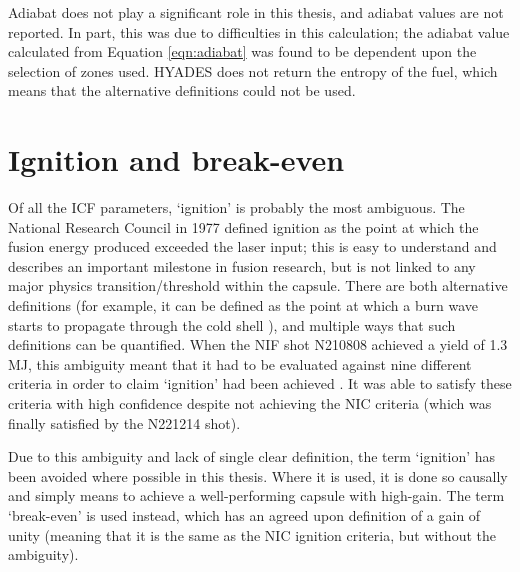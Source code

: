 Adiabat does not play a significant role in this thesis, and adiabat values are not reported. In part, this was due to difficulties in this calculation; the adiabat value calculated from Equation \ref{eqn:adiabat} was found to be dependent upon the selection of zones used. HYADES does not return the entropy of the fuel, which means that the alternative definitions could not be used.


\section{Ignition and break-even}
Of all the ICF parameters, `ignition' is probably the most ambiguous. The National Research Council in 1977 defined ignition as the point at which the fusion energy produced exceeded the laser input; this is easy to understand and describes an important milestone in fusion research, but is not linked to any major physics transition/threshold within the capsule. There are both alternative definitions (for example, it can be defined as the point at which a burn wave starts to propagate through the cold shell \cite{Christopherson2020}), and multiple ways that such definitions can be quantified. When the NIF shot N210808 achieved a yield of 1.3 MJ, this ambiguity meant that it had to be evaluated against nine different criteria in order to claim `ignition' had been achieved \cite{Abu-Shawareb2022}. It was able to satisfy these criteria with high confidence despite not achieving the NIC criteria (which was finally satisfied by the N221214 shot).

Due to this ambiguity and lack of single clear definition, the term `ignition' has been avoided where possible in this thesis. Where it is used, it is done so causally and simply means to achieve a well-performing capsule with high-gain. The term `break-even' is used instead, which has an agreed upon definition of a gain of unity (meaning that it is the same as the NIC ignition criteria, but without the ambiguity).